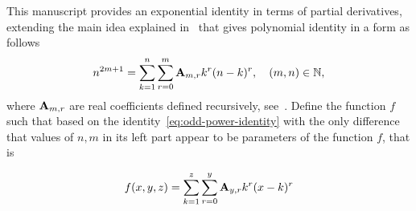 This manuscript provides an exponential identity in terms of partial derivatives,
extending the main idea explained in~\cite{kolosov_2022} that gives polynomial identity in a form as follows
\begin{equation}
    n^{2m+1} = \sum_{k=1}^{n} \sum_{r=0}^{m} {\mathbf{A}} \sb{m,r} k^r (n-k)^r, \quad (m,n) \in \mathbb{N},
    \label{eq:odd-power-identity}
\end{equation}
where ${\mathbf{A}} \sb{m,r}$ are real coefficients defined recursively, see~\cite{kolosov2016link}.
Define the function $f$ such that based on the identity~\eqref{eq:odd-power-identity} with the only difference that
values of $n, m$ in its left part appear to be parameters of the function $f$, that is
\begin{definition}
    \begin{equation}
        f(x, y, z) = \sum_{k=1}^{z} \sum_{r=0}^{y} {\mathbf{A}} \sb{y,r} k^r (x-k)^r\label{eq:definition-f}
    \end{equation}
\end{definition}